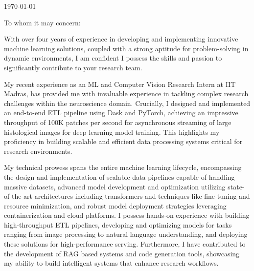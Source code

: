 \documentclass{ExpressiveCoverLetter}
\begin{document}
\coverletterheader[
	firstname=Risan Raja,
	middleinitial=,
	lastname=,
	email=risan.raja@icloud.com,
	linkedin=risanraja,
	github=risan-raja,
]

\vspace{0.25in}
\today
\vspace{0.15in}

To whom it may concern:

With over four years of experience in developing and implementing
innovative machine learning solutions, coupled with a strong aptitude 
for problem-solving in dynamic environments, I am confident I possess 
the skills and passion to significantly contribute to your research team.

My recent experience as an ML and Computer Vision Research Intern at IIT Madras, has provided me 
 with invaluable experience in tackling complex research challenges 
 within the neuroscience domain. Crucially, I designed and implemented an end-to-end ETL 
 pipeline using Dask and PyTorch, achieving an impressive throughput of 
 100K patches per second for asynchronous streaming of large
 histological images for deep learning model training. This highlights 
 my proficiency in building scalable and efficient data processing
 systems critical for research environments.

 My technical prowess spans the entire machine learning lifecycle, 
 encompassing the design and implementation of scalable data pipelines 
 capable of handling massive datasets, advanced model development and 
 optimization utilizing state-of-the-art architectures including 
 transformers and techniques like fine-tuning and resource minimization, 
 and robust model deployment strategies leveraging containerization and 
 cloud platforms. I possess hands-on experience with building
 high-throughput ETL pipelines, developing and optimizing models for 
 tasks ranging from image processing to natural language understanding, 
 and deploying these solutions for high-performance serving.
 Furthermore, I have contributed to the development of RAG based systems 
 and code generation tools, showcasing my ability to build intelligent
 systems that enhance research workflows.
\end{document}
